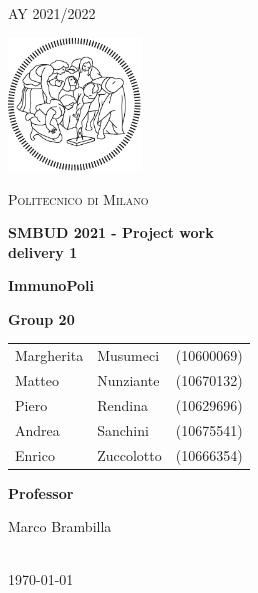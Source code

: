 \documentclass[a4paper, 12p]{article}
\begin{document}
\begin{titlepage}
    \centering
    {\scshape\large AY 2021/2022 \par}
    \vfill
    \includegraphics[width=100pt]{images/logo-polimi-new.pdf}\par\vspace{1cm}
    {\scshape\LARGE Politecnico di Milano \par}
    \vspace{1.5cm}
    {\huge\bfseries SMBUD 2021 - Project work\@ \\ delivery 1  \par}
    
    \vspace{1.5cm}
 
     {\huge\bfseries ImmunoPoli \par}

    \vspace{1.5cm}

    {\large \textbf{Group 20} \par
    
    
        
    \begin{center}
        {\begin{tabular}{l l l}
        Margherita & Musumeci & (10600069)\\
        Matteo & Nunziante & (10670132)\\
        Piero & Rendina & (10629696)\\
        Andrea & Sanchini & (10675541)\\
        Enrico & Zuccolotto & (10666354)\\
        \end{tabular}}
        
    \end{center}
    }
    \vfill
    \begin{center}
        {\large \textbf{Professor}\par
            Marco Brambilla}
          \vspace{1cm}
        {\large \\ \today \par}
    \end{center}
\end{titlepage}
\thispagestyle{plain}
\end{document}

